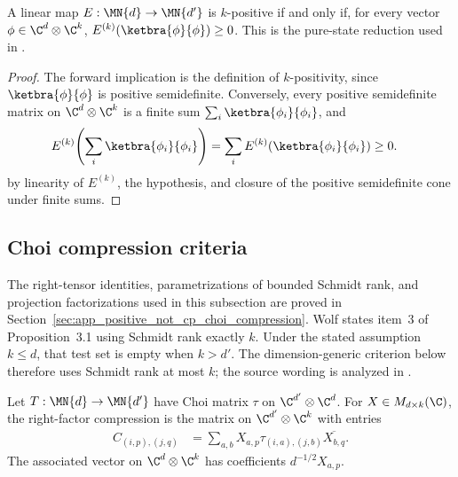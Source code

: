 \begin{theorem}\label{thm:k_positive_rank_one_test}
    \leanok
    A linear map $E:\MN{d}\to\MN{d'}$ is $k$-positive if and only if, for
    every vector $\phi\in\C^d\otimes\C^k$,
    $E^{(k)}(\ketbra{\phi}{\phi})\ge0$.
    This is the pure-state reduction used in
    \cite[Chapter~3, Proposition~3.1]{Wolf2012Quantum}.
\end{theorem}

\begin{proof}
    \leanok
    The forward implication is the definition of $k$-positivity, since
    $\ketbra{\phi}{\phi}$ is positive semidefinite. Conversely, every
    positive semidefinite matrix on $\C^d\otimes\C^k$ is a finite sum
    $\sum_i\ketbra{\phi_i}{\phi_i}$, and
    \begin{align}
        E^{(k)}\!\left(\sum_i\ketbra{\phi_i}{\phi_i}\right)
         & =\sum_iE^{(k)}(\ketbra{\phi_i}{\phi_i})\ge0.
        \notag
    \end{align}
    by linearity of $E^{(k)}$, the hypothesis, and closure of the positive
    semidefinite cone under finite sums.
\end{proof}

\subsection{Choi compression criteria}

The right-tensor identities, parametrizations of bounded Schmidt rank, and
projection factorizations used in this subsection are proved in
Section~\ref{sec:app_positive_not_cp_choi_compression}.
Wolf states item~3 of Proposition~3.1 using Schmidt rank exactly $k$.
Under the stated assumption $k\le d$, that test set is empty when $k>d'$.
The dimension-generic criterion below therefore uses Schmidt rank at most
$k$; the source wording is analyzed in
\cite{gap:wolf_prop3_1_exact_schmidt_rank_scope}.

\begin{definition}\label{def:choi_right_compression}
    \leanok
    Let $T:\MN{d}\to\MN{d'}$ have Choi matrix $\tau$ on
    $\C^{d'}\otimes\C^d$. For $X\in M_{d\times k}(\C)$, the right-factor
    compression is the matrix on $\C^{d'}\otimes\C^k$ with entries
    \begin{align}
        C_{(i,p),(j,q)}
         & =\sum_{a,b}X_{a,p}\tau_{(i,a),(j,b)}
        \overline{X_{b,q}}.
        \label{eq:schwarz_right_choi_compression}
    \end{align}
    The associated vector on $\C^d\otimes\C^k$ has coefficients
    $d^{-1/2}X_{a,p}$.
\end{definition}

